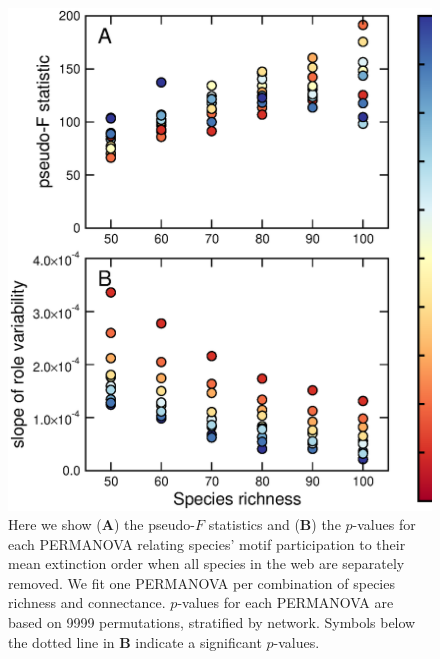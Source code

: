 \documentclass[12pt]{article}
\begin{document}
\begin{spacing}{2.0}
		\begin{figure}[h!]
			\caption{Here we show (\textbf{A}) the pseudo-$F$ statistics and (\textbf{B}) the $p$-values for each PERMANOVA relating species' motif participation to their mean extinction order when all species in the web are separately removed. We fit one PERMANOVA per combination of species richness and connectance. $p$-values for each PERMANOVA are based on 9999 permutations, stratified by network. Symbols below the dotted line in \textbf{B} indicate a significant $p$-values. }
			\label{permfig}
			\includegraphics[height=.5\textheight]{figures/extinction_order/permanova_summary_paper_full.eps}
			\end{figure}



\end{spacing}
\end{document}
